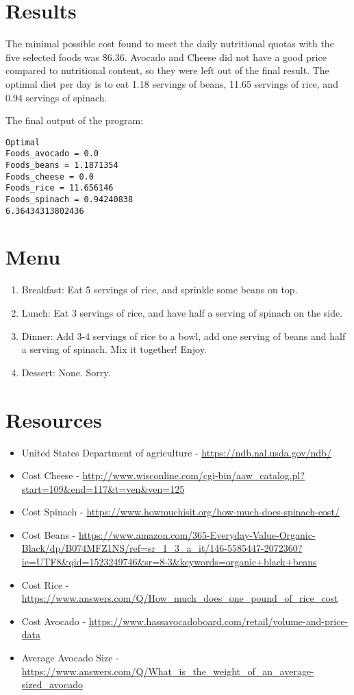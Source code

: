 \documentclass[paper=a4, fontsize=11pt]{scrartcl}
\numberwithin{equation}{section}		%
\numberwithin{figure}{section}			%
\numberwithin{table}{section}				%
\begin{document}
\section{Results}
The minimal possible cost found to meet the daily nutritional quotas with the five selected foods was \$6.36. Avocado and Cheese did not have a good price compared to nutritional content, so they were left out of the final result. The optimal diet per day is to eat 1.18 servings of beans, 11.65 servings of rice, and 0.94 servings of spinach.

The final output of the program:

\begin{lstlisting}
Optimal
Foods_avocado = 0.0
Foods_beans = 1.1871354
Foods_cheese = 0.0
Foods_rice = 11.656146
Foods_spinach = 0.94240838
6.36434313802436
\end{lstlisting}

\section{Menu}

\begin{enumerate}
	\item Breakfast:  Eat 5 servings of rice, and sprinkle some beans on top.  
	\item Lunch: Eat 3 servings of rice, and have half a serving of spinach on the side.
	\item Dinner: Add 3-4 servings of rice to a bowl, add one serving of beans and half a serving of spinach. Mix it together! Enjoy.
    \item Dessert: None. Sorry.
\end{enumerate}

\section{Resources}

\begin{itemize}
\item United States Department of agriculture - \url{https://ndb.nal.usda.gov/ndb/}
\item Cost Cheese - \url{http://www.wisconline.com/cgi-bin/aaw_catalog.pl?start=109&end=117&t=ven&ven=125}
\item Cost Spinach - \url{https://www.howmuchisit.org/how-much-does-spinach-cost/}
\item Cost Beans - \url{https://www.amazon.com/365-Everyday-Value-Organic-Black/dp/B074MFZ1NS/ref=sr_1_3_a_it/146-5585447-2072360?ie=UTF8&qid=1523249746&sr=8-3&keywords=organic+black+beans}
\item Cost Rice - \url{https://www.answers.com/Q/How_much_does_one_pound_of_rice_cost}
\item Cost Avocado - \url{https://www.hassavocadoboard.com/retail/volume-and-price-data}
\item Average Avocado Size - \url{https://www.answers.com/Q/What_is_the_weight_of_an_average-sized_avocado}
  
\end{itemize}
\end{document}
